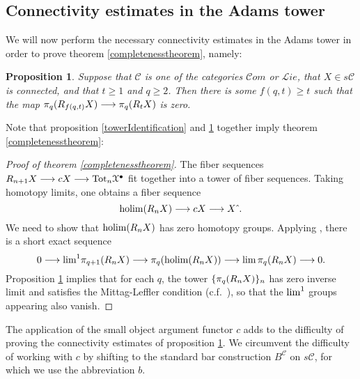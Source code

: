 \documentclass[11pt]{amsart}
\theoremstyle{plain}
\newtheorem{prop}[thm]{Proposition}
\theoremstyle{definition}
\DeclareMathOperator*{\holim}{holim}
\renewcommand{\to}{\longrightarrow}
\newcommand{\scrL}{\mathscr{L}}
\newcommand{\scrC}{\mathscr{C}}
\newcommand{\calX}{\mathcal{X}}
\newcommand{\calC}{\mathcal{C}}
\newcommand{\calc}{\mathcal{C}}
\theoremstyle{plain}
\newcommand{\algs}{{\scrC\!\textit{om}}}
\newcommand{\liealgs}{{\scrL\!\textit{ie}}}
\newcommand{\algcat}{{\calC}}%
\newcommand{\dupdown}[2]{R_{\smash{#1}}}
\newcommand{\algCat}{\calc}
\newcommand{\barConstructionMightAbbreviate}{b}
\begin{document}
\begin{BK spec seq}
\begin{connectivity}
\subsection{Connectivity estimates in the Adams tower}
\label{sec:connectivityAnalysis}
We will now perform the necessary connectivity estimates in the Adams tower in order to prove theorem \ref{completenesstheorem}, namely:  
%
\begin{prop}\label{convergenceProp}
Suppose that $\algcat$ is one of the categories $\algs$ or $\liealgs$, that $X\in s\algcat$ is connected, and that  $t\geq1$ and $q\geq2$. Then there is some $f(q,t)\geq t$ such that the map $\pi_q(\dupdown{f(q,t)}{c}X)\to\pi_q(\dupdown{t}{c}X)$ is zero.
\end{prop}
\noindent Note that proposition \ref{towerIdentification} and \ref{convergenceProp} together imply theorem \ref{completenesstheorem}:
\begin{proof}[Proof of theorem \ref{completenesstheorem}]
The fiber sequences $\dupdown{n+1}{c}X\to cX\to \textup{Tot}_n\calX^\bullet$ fit together into a tower of fiber sequences. Taking homotopy limits, one obtains a fiber sequence
\[\holim (\dupdown{n}{c}X)\to cX\to X\hat{\ }.\]
We need to show that $\holim (\dupdown{n}{c}X)$ has zero homotopy groups.
Applying \cite[Proposition 6.14]{goerss-jardine.pdf}, there is a short exact sequence
\[0\to \textup{lim}^1\pi_{q+1}(\dupdown{n}{c}X)\to \pi_q(\holim (\dupdown{n}{c}X))\to \textup{lim}\,\pi_{q}(\dupdown{n}{c}X)\to 0.\]
Proposition \ref{convergenceProp} implies that for each $q$, the tower $\{\pi_{q}(\dupdown{n}{c}X)\}_n$ has zero inverse limit and satisfies the Mittag-Leffler condition (c.f.\ \cite[p.264]{YellowMonster}), so that the $\textup{lim}^1$ groups appearing also vanish.
\end{proof}
The application of the small object argument functor $c$ adds to the difficulty of proving the connectivity estimates of proposition \ref{convergenceProp}. We circumvent the difficulty of working with $c$ by shifting to the standard bar construction $B^{\algCat}$ on $s\algCat$, for which we use the abbreviation $\barConstructionMightAbbreviate $.


\end{connectivity}
\end{BK spec seq}
\end{document}
